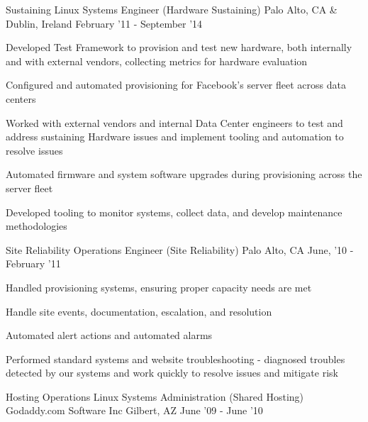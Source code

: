 \begin{cventries}
{\begin{cvitems}
        \end{cvitems}
    }
\vspace{2mm}
\cventry
	{Sustaining Linux Systems Engineer \color{solarized-orange}(Hardware Sustaining)} %
    {} %
	{Palo Alto, CA \& Dublin, Ireland} %
    {February '11 - September '14} %
    {
        \begin{cvitems}
          \item Developed Test Framework to provision and test new hardware, both internally and with external vendors, collecting metrics for hardware evaluation
          \item Configured and automated provisioning for Facebook’s server fleet across data centers
          \item Worked with external vendors and internal Data Center engineers to test and address sustaining Hardware issues and implement tooling and automation to resolve issues
		  \item Automated firmware and system software upgrades during provisioning across the server fleet
		  \item Developed tooling to monitor systems, collect data, and develop maintenance methodologies
        \end{cvitems}
    }
\vspace{2mm}
\cventry
	{Site Reliability Operations Engineer \color{solarized-orange}(Site Reliability)} %
    {} %
    {Palo Alto, CA} %
    {June, '10 - February '11} %
    {
        \begin{cvitems}
          \item Handled provisioning systems, ensuring proper capacity needs are met
          \item Handle site events, documentation, escalation, and resolution 
          \item Automated alert actions and automated alarms
          \item Performed standard systems and website troubleshooting - diagnosed troubles detected by our systems and work quickly to resolve issues and mitigate risk
        \end{cvitems}
    }
\vspace{4mm}
\cventry
	{Hosting Operations Linux Systems Administration \color{solarized-orange}(Shared Hosting)} %
    {Godaddy.com Software Inc} %
    {Gilbert, AZ} %
    {June '09 - June '10} %
    {
        \begin{cvitems}

\end{cvitems}}
\end{cventries}
